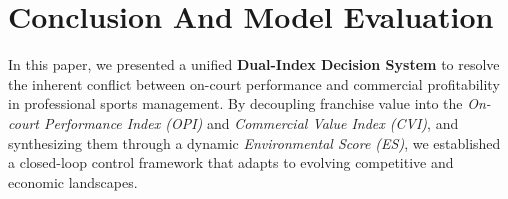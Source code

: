 \documentclass{mcmthesis}
\begin{document}









\section{Conclusion And Model Evaluation}
\label{sec:conclusion}

In this paper, we presented a unified \textbf{Dual-Index Decision System} to resolve the inherent conflict between on-court performance and commercial profitability in professional sports management. By decoupling franchise value into the \textit{On-court Performance Index (OPI)} and \textit{Commercial Value Index (CVI)}, and synthesizing them through a dynamic \textit{Environmental Score (ES)}, we established a closed-loop control framework that adapts to evolving competitive and economic landscapes.
\end{document}
